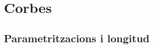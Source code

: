 \documentclass[../geometria-diferencial.tex]{subfiles}
\begin{document}
\chapter{Corbes}
\section{Parametritzacions i longitud}
\begin{comment}
\section{Difeomorfismes de classe \ensuremath{\mathcal{C}^{\infty}}}
    \subsection{Funcions analítiques}
    \begin{definition}[Classe de diferenciabilitat infinita]
        \labelname{classe de diferenciabilitat infinita}\label{def:classe de diferenciabilitat infinita}
        Sigui~\(\obert{U}\subseteq\mathbb{R}^{d}\) un obert i
        \begin{align*}
            f\colon\obert{U}&\longrightarrow\mathbb{R}^{m} \\
            x&\longmapsto(f_{1}(x),\dots,f_{m}(x))
        \end{align*}
        una funció tal que per a tot~\(i\in\{1,\dots,m\}\) la funció~\(f_{i}\) és de classe~\(\mathcal{C}^{k}\) per a tot natural~\(k\in\mathbb{N}\).
        Aleshores direm que~\(f\) és de classe de diferenciabilitat infinita.
        També direm que~\(f\) és de classe~\(\mathcal{C}^{\infty}\).
    \end{definition}
    \begin{definition}[Funció analítica]
        \labelname{funció analítica}\label{def:funció analítica}
        Sigui~\(\obert{U}\subseteq\mathbb{R}^{d}\) un obert,
        \begin{align*}
            f\colon\obert{U}&\longrightarrow\mathbb{R}^{m} \\
            x&\longmapsto(f_{1}(x),\dots,f_{m}(x))
        \end{align*}
        una funció de classe~\(\mathcal{C}^{\infty}\) i~\(x_{0}\in\obert{U}\) un punt tal que existeix una sèrie de potències~\(\sum_{n=0}^{\infty}a_{n}(x-x_{0})^{n}\) tal que existeix un entorn~\(N_{x_{0}}\subseteq\obert{U}\) satisfent que per a tot~\(x\in N_{x_{0}}\) la sèrie de potències~\(\sum_{n=0}^{\infty}a_{n}(x-x_{0})^{n}\) convergeix puntualment a~\(f(x)\).

\end{comment}
\end{document}

